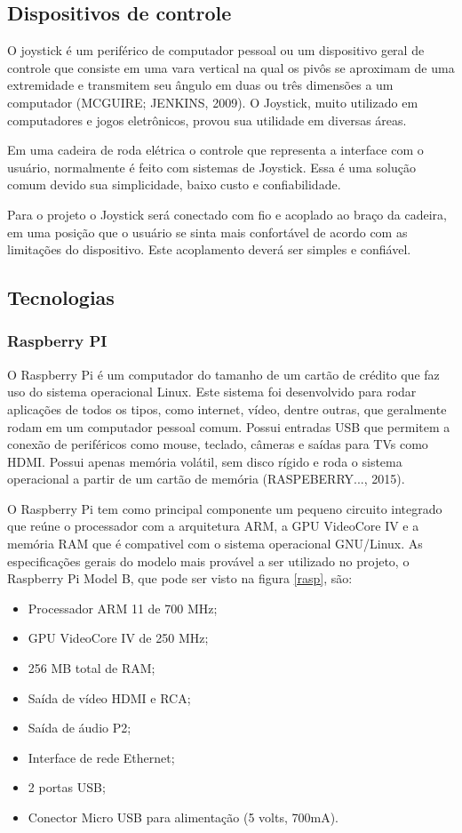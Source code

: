 \subsection{Dispositivos de controle}

O joystick é um periférico de computador pessoal ou um dispositivo geral de controle que consiste em uma vara vertical na qual os pivôs se aproximam de uma extremidade e transmitem seu ângulo em duas ou três dimensões a um computador (MCGUIRE; JENKINS, 2009). O Joystick, muito utilizado em computadores e jogos eletrônicos, provou sua utilidade em diversas áreas.

Em uma cadeira de roda elétrica o controle que representa a interface com o usuário, normalmente é feito com sistemas de Joystick. Essa é uma solução comum devido sua simplicidade, baixo custo e confiabilidade.

Para o projeto o Joystick será conectado com fio e acoplado ao braço da cadeira, em uma posição que o usuário se sinta mais confortável de acordo com as limitações do dispositivo. Este acoplamento deverá ser simples e confiável.


\subsection{Tecnologias}
\label{subsec:tecnologias}
\subsubsection{Raspberry PI}


O Raspberry Pi é um computador do tamanho de um cartão de crédito que faz uso do sistema operacional Linux. Este sistema foi desenvolvido para rodar aplicações de todos os tipos, como internet, vídeo, dentre outras, que geralmente rodam em um computador pessoal comum. Possui entradas USB que permitem a conexão de periféricos como mouse, teclado, câmeras e saídas para TVs como HDMI. Possui apenas memória volátil, sem disco rígido e roda o sistema operacional a partir de um cartão de memória (RASPEBERRY..., 2015).

O Raspberry Pi tem como principal componente um pequeno circuito integrado que reúne o processador com a arquitetura ARM, a GPU VideoCore IV e a memória RAM que é compativel com o sistema operacional GNU/Linux. As especificações gerais do modelo mais provável a ser utilizado no projeto, o Raspberry Pi Model B, que pode ser visto na figura \ref{rasp}, são:

\begin{itemize}
	\item Processador ARM 11 de 700 MHz;
	\item GPU VideoCore IV de 250 MHz;
	\item 256 MB total de RAM;
	\item Saída de vídeo HDMI e RCA;
	\item Saída de áudio P2;
	\item Interface de rede Ethernet;
	\item 2 portas USB;
	\item Conector Micro USB para alimentação (5 volts, 700mA).
\end{itemize}

